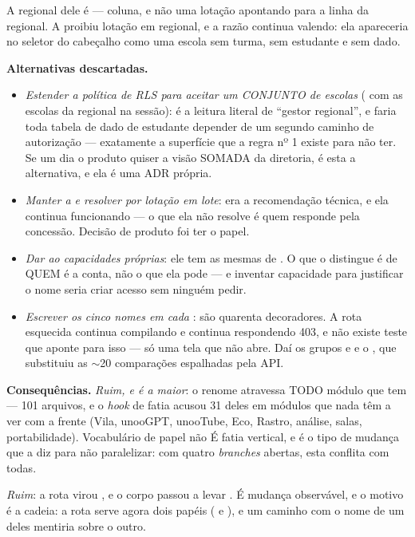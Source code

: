 A regional dele é  --- coluna, e não uma lotação
apontando para a linha da regional. A  proibiu lotação em regional,
e a razão continua valendo: ela apareceria no seletor do cabeçalho como uma
escola sem turma, sem estudante e sem dado.

\textbf{Alternativas descartadas.}
\begin{itemize}
  \item \emph{Estender a política de RLS para aceitar um CONJUNTO de escolas}
    ( com as escolas da regional na sessão): é a
    leitura literal de \enquote{gestor regional}, e faria toda tabela de dado de
    estudante depender de um segundo caminho de autorização --- exatamente a
    superfície que a regra nº 1 existe para não ter. Se um dia o produto quiser
    a visão SOMADA da diretoria, é esta a alternativa, e ela é uma ADR própria.
  \item \emph{Manter a  e resolver por lotação em lote}: era a
    recomendação técnica, e ela continua funcionando --- o que ela não resolve é
    quem responde pela concessão. Decisão de produto foi ter o papel.
  \item \emph{Dar ao  capacidades próprias}: ele tem as mesmas de
    . O que o distingue é de QUEM é a conta, não o que ela
    pode --- e inventar capacidade para justificar o nome seria criar acesso sem
    ninguém pedir.
  \item \emph{Escrever os cinco nomes em cada }: são quarenta
    decoradores. A rota esquecida continua compilando e continua respondendo
    403, e não existe teste que aponte para isso --- só uma tela que não abre.
    Daí os grupos  e  e o
    , que substituiu as $\sim$20 comparações
     espalhadas pela API.
\end{itemize}

\textbf{Consequências.} \emph{Ruim, e é a maior}: o renome atravessa TODO módulo
que tem  --- 101 arquivos, e o \emph{hook} de fatia acusou 31 deles em
módulos que nada têm a ver com a frente (Vila, unooGPT, unooTube, Eco, Rastro,
análise, salas, portabilidade). Vocabulário de papel não É fatia vertical, e é o
tipo de mudança que a  diz para não paralelizar: com quatro
\emph{branches} abertas, esta conflita com todas.

\emph{Ruim}: a rota  virou
, e o corpo passou a levar . É mudança
observável, e o motivo é a cadeia: a rota serve agora dois papéis
( e ), e um caminho com o nome de um
deles mentiria sobre o outro.

